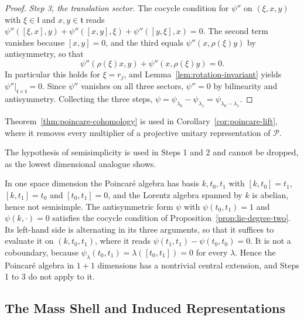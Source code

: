 \begin{proof}
	\emph{Step 3, the translation sector.} The cocycle condition for $\psi''$ on $(\xi,x,y)$ with $\xi\in\mathfrak{l}$ and $x,y\in\mathfrak{t}$ reads $\psi''([\xi,x],y)+\psi''([x,y],\xi)+\psi''([y,\xi],x)=0$. The second term vanishes because $[x,y]=0$, and the third equals $\psi''(x,\rho(\xi)y)$ by antisymmetry, so that
	\begin{equation*}
		\psi''(\rho(\xi)x,y)+\psi''(x,\rho(\xi)y)=0.
	\end{equation*}
	In particular this holds for $\xi=r_j$, and Lemma~\ref{lem:rotation-invariant} yields $\psi''|_{\mathfrak{t}\times\mathfrak{t}}=0$. Since $\psi''$ vanishes on all three sectors, $\psi''=0$ by bilinearity and antisymmetry. Collecting the three steps, $\psi=\psi_{\lambda_0}-\psi_{\lambda_1}=\psi_{\lambda_0-\lambda_1}$.
\end{proof}

\noindent Theorem~\ref{thm:poincare-cohomology} is used in Corollary~\ref{cor:poincare-lift}, where it removes every multiplier of a projective unitary representation of $\mathcal{P}$.

The hypothesis of semisimplicity is used in Steps 1 and 2 and cannot be dropped, as the lowest dimensional analogue shows.

\begin{remark}\label{rem:one-plus-one}
	In one space dimension the Poincar\'e algebra has basis $k,t_0,t_1$ with $[k,t_0]=t_1$, $[k,t_1]=t_0$ and $[t_0,t_1]=0$, and the Lorentz algebra spanned by $k$ is abelian, hence not semisimple. The antisymmetric form $\psi$ with $\psi(t_0,t_1)=1$ and $\psi(k,\cdot)=0$ satisfies the cocycle condition of Proposition~\ref{prop:lie-degree-two}. Its left-hand side is alternating in its three arguments, so that it suffices to evaluate it on $(k,t_0,t_1)$, where it reads $\psi(t_1,t_1)-\psi(t_0,t_0)=0$. It is not a coboundary, because $\psi_\lambda(t_0,t_1)=\lambda([t_0,t_1])=0$ for every $\lambda$. Hence the Poincar\'e algebra in $1+1$ dimensions has a nontrivial central extension, and Steps 1 to 3 do not apply to it.
\end{remark}

\subsection{The Mass Shell and Induced Representations}
\label{subsec:mass-shell-induced}

